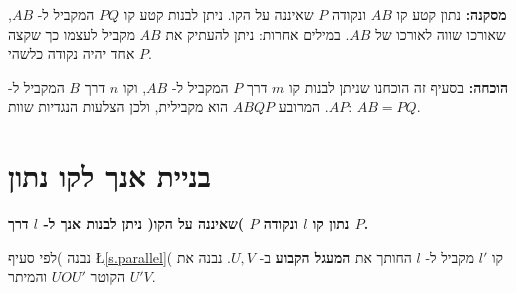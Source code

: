 \textbf{%
מסקנה:%
}
נתון קטע קו 
$AB$
ונקודה
$P$
שאיננה על הקו. ניתן לבנות קטע קו
$PQ$
המקביל ל-%
$AB$,
שאורכו שווה לאורכו של
$AB$.
במילים אחרות: ניתן להעתיק את
$AB$
מקביל לעצמו כך שקצה אחד יהיה נקודה כלשהי
$P$.

\textbf{%
הוכחה:%
}
בסעיף זה הוכחנו שניתן לבנות קו 
$m$
דרך 
$P$
המקביל ל-%
$AB$,
וקו
$n$
דרך 
$B$
המקביל ל-%
$AP$.
המרובע 
$ABQP$
הוא מקבילית, ולכן הצלעות הנגדיות שוות:
$AB=PQ$.
\begin{center}
\end{center}


\section{%
בניית אנך לקו נתון%
}\label{s.perpendicular}

\textbf{%
נתון קו
$l$
ונקודה
$P$
)שאיננה על הקו( ניתן לבנות אנך ל-%
$l$
דרך
$P$.%
}

נבנה )לפי סעיף
\L{\ref{s.parallel}}(
קו
$l'$
מקביל ל-%
$l$
החותך את
\textbf{%
המעגל הקבוע%
}
ב-%
$U,V$.
נבנה את הקוטר
$UOU'$
והמיתר
$U'V$.

\np

